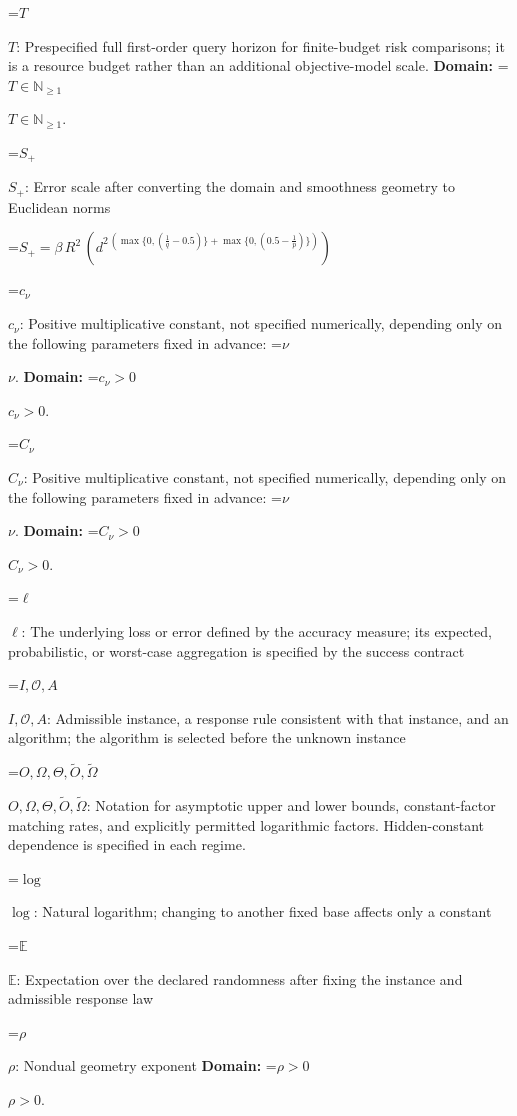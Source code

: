 \documentclass[10pt,a4paper]{article}
\newcommand{\AtlasMath}[1]{\par\begingroup\centering\setbox0=\hbox{$\displaystyle #1$}\ifdim\wd0>1.4\linewidth\typeout{ATLAS WIDE FORMULA: \the\wd0}\fi\ifdim\wd0>\linewidth\resizebox{\linewidth}{!}{\box0}\else\box0\fi\par\endgroup}
\newcommand{\AtlasInlineMath}[1]{\begingroup\setbox0=\hbox{$#1$}\ifdim\wd0>.4\linewidth\endgroup\AtlasMath{#1}\else\endgroup$#1$\fi}
\begin{document}
\AtlasInlineMath{T}: Prespecified full first-order query horizon for finite-budget risk comparisons; it is a resource budget rather than an additional objective-model scale. \textbf{Domain:} \AtlasInlineMath{T\in\mathbb{N}_{\ge1}}.



\AtlasInlineMath{S_+}: Error scale after converting the domain and smoothness geometry to Euclidean norms




\AtlasMath{S_+=\beta\,{R}^{2}\,({d}^{2\,(\max\{0,(\frac{1}{q}-0.5)\}+\max\{0,(0.5-\frac{1}{p})\})})}




\AtlasInlineMath{c_{\nu}}: Positive multiplicative constant, not specified numerically, depending only on the following parameters fixed in advance: \AtlasInlineMath{\nu}. \textbf{Domain:} \AtlasInlineMath{c_{\nu}>0}.



\AtlasInlineMath{C_{\nu}}: Positive multiplicative constant, not specified numerically, depending only on the following parameters fixed in advance: \AtlasInlineMath{\nu}. \textbf{Domain:} \AtlasInlineMath{C_{\nu}>0}.



\AtlasInlineMath{\ell}: The underlying loss or error defined by the accuracy measure; its expected, probabilistic, or worst-case aggregation is specified by the success contract



\AtlasInlineMath{I,\mathcal{O},A}: Admissible instance, a response rule consistent with that instance, and an algorithm; the algorithm is selected before the unknown instance



\AtlasInlineMath{O,\Omega,\Theta,\widetilde{O},\widetilde\Omega}: Notation for asymptotic upper and lower bounds, constant-factor matching rates, and explicitly permitted logarithmic factors. Hidden-constant dependence is specified in each regime.



\AtlasInlineMath{\log}: Natural logarithm; changing to another fixed base affects only a constant



\AtlasInlineMath{\mathbb{E}}: Expectation over the declared randomness after fixing the instance and admissible response law



\AtlasInlineMath{\rho}: Nondual geometry exponent \textbf{Domain:} \AtlasInlineMath{\rho>0}.
\end{document}
